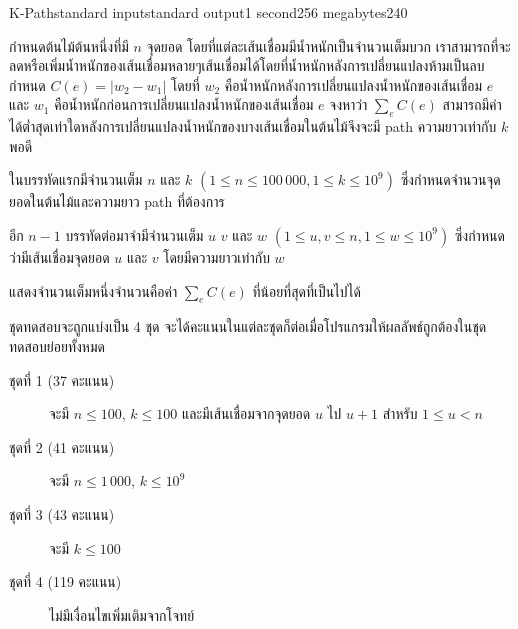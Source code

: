 \documentclass[11pt,a4paper]{article}
\begin{document}
\begin{problem}{K-Path}{standard input}{standard output}{1 second}{256 megabytes}{240}

กำหนดต้นไม้ต้นหนึ่งที่มี $n$ จุดยอด โดยที่แต่ละเส้นเชื่อมมีน้ำหนักเป็นจำนวนเต็มบวก เราสามารถที่จะลดหรือเพิ่มน้ำหนักของเส้นเชื่อมหลายๆเส้นเชื่อมได้โดยที่น้ำหนักหลังการเปลี่ยนแปลงห้ามเป็นลบ กำหนด $C(e) = \lvert w_2 - w_1 \rvert$ โดยที่ $w_2$ คือน้ำหนักหลังการเปลี่ยนแปลงน้ำหนักของเส้นเชื่อม $e$ และ $w_1$ คือน้ำหนักก่อนการเปลี่ยนแปลงน้ำหนักของเส้นเชื่อม $e$ จงหาว่า $\sum\limits_{e} C(e)$ สามารถมีค่าได้ต่ำสุดเท่าใดหลังการเปลี่ยนแปลงน้ำหนักของบางเส้นเชื่อมในต้นไม้จึงจะมี path ความยาวเท่ากับ $k$ พอดี

\InputFile
ในบรรทัดแรกมีจำนวนเต็ม $n$ และ $k$ $(1 \leq n \leq 100\,000, 1 \leq k \leq 10^9)$ ซึ่งกำหนดจำนวนจุดยอดในต้นไม้และความยาว path ที่ต้องการ

อีก $n-1$ บรรทัดต่อมาจำมีจำนวนเต็ม $u$ $v$ และ $w$ $(1 \leq u, v \leq n, 1 \leq w \leq 10^9)$ ซึ่งกำหนดว่ามีเส้นเชื่อมจุดยอด $u$ และ $v$ โดยมีความยาวเท่ากับ $w$

\OutputFile
แสดงจำนวนเต็มหนึ่งจำนวนคือค่า $\sum\limits_{e} C(e)$ ที่น้อยที่สุดที่เป็นไปได้


\Scoring
ชุดทดสอบจะถูกแบ่งเป็น 4 ชุด จะได้คะแนนในแต่ละชุดก็ต่อเมื่อโปรแกรมให้ผลลัพธ์ถูกต้องในชุดทดสอบย่อยทั้งหมด
\begin{description}
\item[ชุดที่ 1 (37 คะแนน)] จะมี $n \leq 100$, $k \leq 100$ และมีเส้นเชื่อมจากจุดยอด $u$ ไป $u+1$ สำหรับ $1 \leq u < n$

\item[ชุดที่ 2 (41 คะแนน)] จะมี $n \leq 1\,000$, $k \leq 10^9$

\item[ชุดที่ 3 (43 คะแนน)] จะมี $k \leq 100$

\item[ชุดที่ 4 (119 คะแนน)] ไม่มีเงื่อนไขเพิ่มเติมจากโจทย์
\end{description}

\Examples

\begin{example}
%
%
\end{example}

\end{problem}
\end{document}
